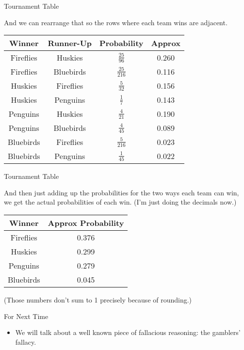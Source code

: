 \documentclass[
  ignorenonframetext,
]{beamer}
\providecommand{\tightlist}{%
  \setlength{\itemsep}{0pt}\setlength{\parskip}{0pt}}
\renewcommand{\,}{\text{, }}
\begin{document}
\begin{frame}{Tournament Table}
\protect\hypertarget{tournament-table-1}{}

And we can rearrange that so the rows where each team wins are adjacent.

\begin{longtable}[]{@{}cccc@{}}
\toprule
Winner & Runner-Up & Probability & Approx\tabularnewline
\midrule
\endhead
Fireflies & Huskies & \(\frac{25}{96}\) & 0.260\tabularnewline
Fireflies & Bluebirds & \(\frac{25}{216}\) & 0.116\tabularnewline
Huskies & Fireflies & \(\frac{5}{32}\) & 0.156\tabularnewline
Huskies & Penguins & \(\frac{1}{7}\) & 0.143\tabularnewline
Penguins & Huskies & \(\frac{4}{21}\) & 0.190\tabularnewline
Penguins & Bluebirds & \(\frac{4}{45}\) & 0.089\tabularnewline
Bluebirds & Fireflies & \(\frac{5}{216}\) & 0.023\tabularnewline
Bluebirds & Penguins & \(\frac{1}{45}\) & 0.022\tabularnewline
\bottomrule
\end{longtable}

\end{frame}

\begin{frame}{Tournament Table}
\protect\hypertarget{tournament-table-2}{}

And then just adding up the probabilities for the two ways each team can
win, we get the actual probabilities of each win. (I'm just doing the
decimals now.)

\begin{longtable}[]{@{}cc@{}}
\toprule
Winner & Approx Probability\tabularnewline
\midrule
\endhead
Fireflies & 0.376\tabularnewline
Huskies & 0.299\tabularnewline
Penguins & 0.279\tabularnewline
Bluebirds & 0.045\tabularnewline
\bottomrule
\end{longtable}

(Those numbers don't sum to 1 precisely because of rounding.)

\end{frame}

\begin{frame}{For Next Time}
\protect\hypertarget{for-next-time}{}

\begin{itemize}
\tightlist
\item
  We will talk about a well known piece of fallacious reasoning: the
  gamblers' fallacy.
\end{itemize}

\end{frame}
\end{document}

